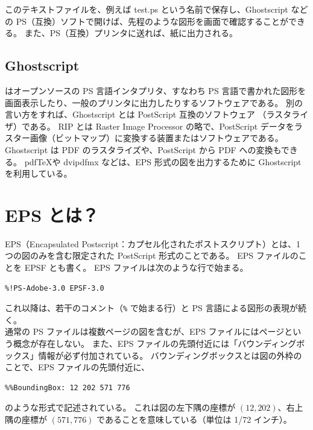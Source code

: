 このテキストファイルを、例えば test.ps という名前で保存し、Ghostscript などの PS（互換）ソフトで開けば、先程のような図形を画面で確認することができる。
また、PS（互換）プリンタに送れば、紙に出力される。
\subsection{Ghostscript}
 はオープンソースの PS 言語インタプリタ、すなわち PS 言語で書かれた図形を画面表示したり、一般のプリンタに出力したりするソフトウェアである。
別の言い方をすれば、Ghostscript とは PostScript 互換のソフトウェア （ラスタライザ）である。
RIP とは Raster Image Processor の略で、PostScript データをラスター画像（ビットマップ）に変換する装置またはソフトウェアである。
Ghostscript は PDF のラスタライズや、PostScript から PDF への変換もできる。
pdf\TeX{}や dvipdfmx などは、EPS 形式の図を出力するために Ghostscript を利用している。
\section{EPS とは？}
EPS（Encapsulated Postscript：カプセル化されたポストスクリプト）とは、1 つの図のみを含む限定された PostScript 形式のことである。
EPS ファイルのことを EPSF とも書く。
EPS ファイルは次のような行で始まる。
\begin{mdframed}[roundcorner=0.50zw,leftmargin=3.00zw,rightmargin=3.00zw,skipabove=0.40zw,skipbelow=0.40zw,innertopmargin=4.00pt,innerbottommargin=4.00pt,innerleftmargin=5.00pt,innerrightmargin=5.00pt,linecolor=gray!020,linewidth=0.50pt,backgroundcolor=gray!20]
\begin{verbatim}
%!PS-Adobe-3.0 EPSF-3.0
\end{verbatim}
\end{mdframed}
これ以降は、若干のコメント（\texttt{\%} で始まる行）と PS 言語による図形の表現が続く。\\

通常の PS ファイルは複数ページの図を含むが、EPS ファイルにはページという概念が存在しない。
また、EPS ファイルの先頭付近には「バウンディングボックス」情報が必ず付加されている。
バウンディングボックスとは図の外枠のことで、EPS ファイルの先頭付近に、
\begin{mdframed}[roundcorner=0.50zw,leftmargin=3.00zw,rightmargin=3.00zw,skipabove=0.40zw,skipbelow=0.40zw,innertopmargin=4.00pt,innerbottommargin=4.00pt,innerleftmargin=5.00pt,innerrightmargin=5.00pt,linecolor=gray!020,linewidth=0.50pt,backgroundcolor=gray!20]
\begin{verbatim}
%%BoundingBox: 12 202 571 776
\end{verbatim}
\end{mdframed}
のような形式で記述されている。
これは図の左下隅の座標が $(12,202)$、右上隅の座標が $(571,776)$ であることを意味している（単位は 1/72 インチ）。\\

